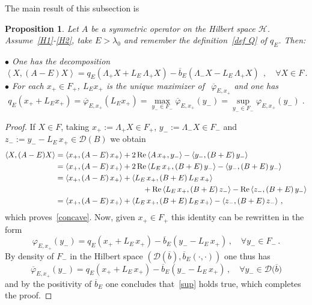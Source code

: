 \documentclass[12pt,reqno]{amsart}
\newtheorem{proposition}[theorem]{Proposition}
\newcommand{\innerproduct}[2]{\left\langle #1, #2 \right\rangle}
\newcommand{\be}[1]{\begin{equation}\label{#1}}
\newcommand{\ee}{\end{equation}}
\renewcommand{\(}{\left(}
\renewcommand{\)}{\right)}
\renewcommand{\Re}{\mathrm{Re}}
\begin{document}
The main result of this subsection is
\begin{proposition}\label{Prop:thm1-a}
Let $A$ be a symmetric operator on the Hilbert space $\mathcal H$. Assume~\eqref{H1}-\eqref{H2}, take $E>\lambda_0$ and remember the definition~\eqref{def Q} of $q_E$. Then:

\noindent
$\bullet$ One has the decomposition
\be{concave}
\innerproduct{X}{(A-E)X}= q_E(\Lambda_+X+L_E\,\Lambda_+X)- \overline{b}_E(\Lambda_-X-L_E\,\Lambda_+X)\;\, ,\quad\forall X\in F\,.
\ee
$\bullet$ For each $x_+\in F_+$, $L_E x_+$ is the unique maximizer of  $\;\,\overline{\varphi}_{E, x_+}$ and one has
\be{sup}
q_E(x_++L_Ex_+)=\overline{\varphi}_{E, x_+}(L_Ex_+)=\max_{y_-\in F_-} \overline{\varphi}_{E, x_+}(y_-)=\sup_{y_-\in F_-} \varphi_{E, x_+}(y_-)\;.
\ee
\end{proposition}
\begin{proof} If $X\in F$, taking $x_+:=\Lambda_+X\in F_+$, $y_-:=\Lambda_-X\in F_-$ and $z_-:= y_--L_E\,x_+\in \mathcal D(B)$ we obtain
\begin{align*}
\innerproduct{X}{(A-E)X}&= \innerproduct{x_+}{(A-E)\,x_+}+2\,\Re\innerproduct{A\,x_+}{y_-}-\innerproduct{y_-}{(B+E)\,y_-}\\
&= \innerproduct{x_+}{(A-E)\,x_+}+2\,\Re\innerproduct{L_E\,x_+}{(B+E)\,y_-}-\innerproduct{y_-}{(B+E)\,y_-}\\
&= \innerproduct{x_+}{(A-E)\,x_+}+\innerproduct{L_E\,x_+}{(B+E)\,L_E\,x_+}\\
&\hspace*{4cm}+\Re \innerproduct{L_E\,x_+}{(B+E)\,z_-} -\Re \innerproduct{z_-}{(B+E)\,y_-}\\
&= \innerproduct{x_+}{(A-E)\,x_+}+\innerproduct{L_E\,x_+}{(B+E)\,L_E\,x_+}-\innerproduct{z_-}{(B+E)\,z_-}\,,
\end{align*}
which proves~\eqref{concave}. Now, given $x_+\in F_+$ this identity can be rewritten
in the form
\[ \varphi_{E, x_+}(y_-)=q_E(x_++L_E\,x_+)- \overline{b}_E(y_--L_E\,x_+)\,,\quad\forall y_-\in F_-\,.\]
By density of $F_-$ in the Hilbert space $\(\mathcal D(\overline{b}),\overline{b}_E(\cdot,\cdot)\)$ one thus has
\[ \overline{\varphi}_{E, x_+}(y_-)=q_E(x_++L_E\,x_+)- \overline{b}_E(y_--L_E\,x_+)\,,\quad\forall y_-\in \mathcal D\big(\overline{b}\big)\]
and by the positivity of $\overline{b}_E$ one concludes that~\eqref{sup} holds true,
which completes the proof.\end{proof}
\end{document}
